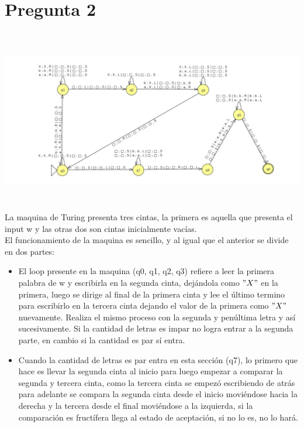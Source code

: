 \documentclass[11pt,letterpaper]{article}
\begin{document}
\section{Pregunta 2}
\includegraphics[height=8cm]{p2.png}
La maquina de Turing presenta tres cintas, la primera es aquella que presenta el input w y las otras dos son cintas inicialmente vacías. \\
El funcionamiento de la maquina es sencillo, y al igual que el anterior se divide en dos partes:
\begin{itemize}
	\item El loop presente en la maquina (q0, q1, q2, q3) refiere a leer la primera palabra de w y escribirla en la segunda cinta, dejándola como $"X"$ en la primera, luego se dirige al final de la primera cinta y lee el último termino para escribirlo en la tercera cinta dejando el valor de la primera como $"X"$ nuevamente. Realiza el mismo proceso con la segunda y penúltima letra y así sucesivamente. Si la cantidad de letras es impar no logra entrar a la segunda parte, en cambio si la cantidad es par sí entra.
	\item Cuando la cantidad de letras es par entra en esta sección (q7), lo primero que hace es llevar la segunda cinta al inicio para luego empezar a comparar la segunda y tercera cinta, como la tercera cinta se empezó escribiendo de atrás para adelante se compara la segunda cinta desde el inicio moviéndose hacia la derecha y la tercera desde el final moviéndose a la izquierda, si la comparación es fructífera llega al estado de aceptación, si no lo es, no lo hará.
\end{itemize}
\end{document}
